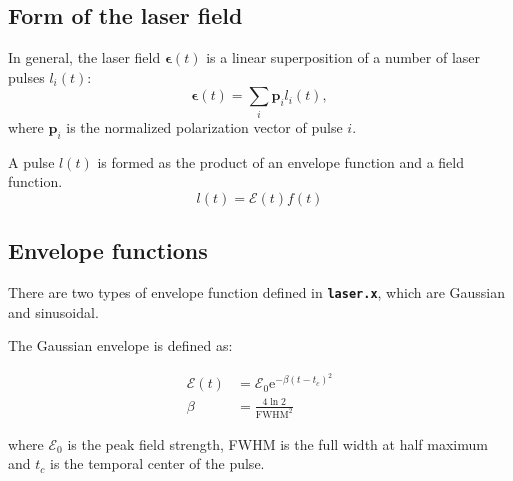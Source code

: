 \documentclass[a4paper,11pt,DIV=15,openany,twoside=false]{scrbook}
\newcommand{\tthdump}[1]{#1}
\newcommand{\ttt}[1]{\textbf{\texttt{#1}}}
\newcommand{\E}{\ensuremath{\mathrm{e}}}
\newcommand{\VEC}[1]{\ensuremath{\mathbf{#1}}}
\begin{document}
\subsection{Form of the laser field}

In general, the laser field $\boldsymbol{\epsilon}(t)$ is a linear superposition of a number of laser pulses $l_i(t)$:
\begin{equation}
  \boldsymbol{\epsilon}(t)=\sum\limits_i \VEC{p}_il_i(t),
\end{equation}
where $\VEC{p}_i$ is the normalized polarization vector of pulse $i$.

A pulse $l(t)$ is formed as the product of an envelope function and a field function. 
\begin{equation}
  l(t)=\mathcal{E}(t)f(t)
\end{equation}

\subsection{Envelope functions}

There are two types of envelope function defined in \ttt{laser.x}, which are Gaussian and sinusoidal.

The Gaussian envelope is defined as:
\tthdump{
  \begin{align}
    \mathcal{E}(t)&=\mathcal{E}_0 \E^{-\beta(t-t_c)^2}\label{eq:laser_gauss_1}\\
    \beta&=\frac{4\ln 2}{\mathrm{FWHM}^2}\label{eq:laser_gauss_2}
  \end{align}
}
where $\mathcal{E}_0$ is the peak field strength, FWHM is the full width at half maximum and $t_c$ is the temporal center of the pulse.
\end{document}
